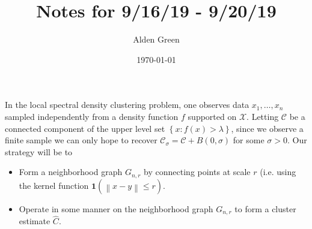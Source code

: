 \documentclass{article}
\newcommand{\norm}[1]{\left\lVert#1\right\rVert}
\newcommand{\set}[1]{\left\{#1\right\}}
\newcommand{\1}{\mathbf{1}}
\newcommand{\Cset}{\mathcal{C}}
\newcommand{\Csig}{\Cset_{\sigma}}
\theoremstyle{alden}
\theoremstyle{aldenthm}
\theoremstyle{definition}
\theoremstyle{remark}
\begin{document}
\title{Notes for 9/16/19 - 9/20/19}
\author{Alden Green}
\date{\today}
\maketitle

In the local spectral density clustering problem, one observes data $x_1,\ldots,x_n$ sampled independently from a density function $f$ supported on $\mathcal{X}$. Letting $\Cset$ be a connected component of the upper level set $\set{x:f(x) > \lambda}$, since we observe a finite sample we can only hope to recover $\Csig = \Cset + B(0,\sigma)$ for some $\sigma > 0$. Our strategy will be to
\begin{itemize}
	\item Form a neighborhood graph $G_{n,r}$ by connecting points at scale $r$ (i.e. using the kernel function $\1(\norm{x - y} \leq r)$. 
	\item Operate in some manner on the neighborhood graph $G_{n,r}$ to form a cluster estimate $\hat{C}$. 
\end{itemize}
\end{document}
